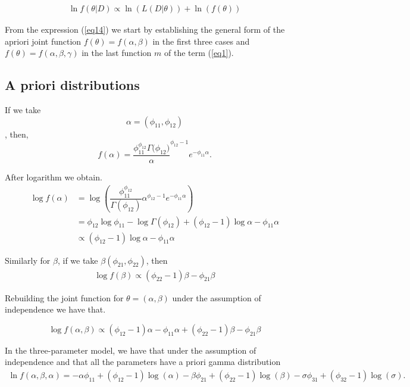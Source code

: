 \documentclass[APA,STIX1COL]{WileyNJD-v2}
\begin{document}
\begin{align}%
	\label{eq14}
\ln f(\theta|D)\propto \ln(L(D|\theta)) + \ln(f(\theta))
\end{align}



From the expression (\ref{eq14}) we start by establishing the general form of the apriori joint function $f(\theta)=f(\alpha, \beta)$ in the first three cases and $f(\theta)=f(\alpha, \beta, \gamma)$ in the last function $m$ of the term (\ref{eq1}).\\



\subsection{A priori distributions}

If we take 
$$\alpha=(\phi_{11},\phi_{12})$$,
then,
$$ f(\alpha) = \dfrac{\phi_{11}^{\phi_{12}}{\Gamma(\phi_{12}})} \alpha^{\phi_{12}-1}e^{-\phi_{11} \alpha}. $$

After logarithm we obtain.
\begin{align} \label{eq15}
	\log  f(\alpha) &= \log\left( \dfrac{\phi_{11}^{\phi_{12}}}{\Gamma(\phi_{12})} \alpha^{\phi_{12}-1}e^{-\phi_{11} \alpha} \right)\nonumber\\
	&=  \phi_{12}\log\phi_{11} - \log\Gamma(\phi_{12}) + (\phi_{12}-1)\log\alpha - \phi_{11}\alpha\nonumber\\
	&\propto (\phi_{12}-1)\log\alpha - \phi_{11}\alpha
\end{align}

Similarly for $\beta$, if we take $\beta(\phi_{21},\phi_{22})$, then
\begin{align} \label{eq16}
	\log f(\beta) \propto (\phi_{22}-1)\beta - \phi_{21}\beta
\end{align}

Rebuilding the joint function for $\theta=(\alpha,\beta)$ under the assumption of independence we have that. 

\begin{equation}
	\label{eq17}
\log f(\alpha,\beta) \propto (\phi_{12}-1)\alpha - \phi_{11}\alpha + (\phi_{22}-1)\beta - \phi_{21}\beta
\end{equation}


In the three-parameter model, we have that under the assumption of independence and that all the parameters have a priori gamma distribution
\begin{align}%
	\label{eq18}
\ln f(\alpha,\beta, \alpha) = -\alpha \phi _{11}+\left(\phi _{12}-1\right) \log (\alpha )-\beta \phi _{21}+\left(\phi _{22}-1\right) \log (\beta )-\sigma \phi _{31}+\left(\phi _{32}-1\right) \log (\sigma ). 
\end{align}
\end{document}
